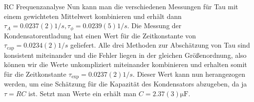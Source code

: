 \documentclass{alex_gp}
\begin{document}
\begin{mybox}{RC Frequenzanalyse}
	Nun kann man die verschiedenen Messungen für Tau mit einem gewichteten Mittelwert kombinieren und erhält dann \( \tau_{A} = 0.0237(2) \unit{1/s}, \tau_{\phi} = 0.0239(5) \unit{1/s} \). Die Messung der Kondensatorentladung hat einen Wert für die Zeitkonstante von \( \tau_{\text{cap}} = 0.0234(2) \unit{1/s} \) geliefert. Alle drei Methoden zur Abschätzung von Tau sind konsistent miteinander und die Fehler liegen in der gleichen Größenordnung, also können wir die Werte unkompliziert miteinander kombinieren und erhalten somit für die Zeitkonstante \( \tau_{\text{exp}} = 0.0237(2) \unit{1/s} \). Dieser Wert kann nun herangezogen werden, um eine Schätzung für die Kapazität des Kondensators abzugeben, da ja \( \tau = RC \) ist. Setzt man Werte ein erhält man \( C = 2.37(3) \unit{\micro\farad} \).
\end{mybox}
\end{document}
